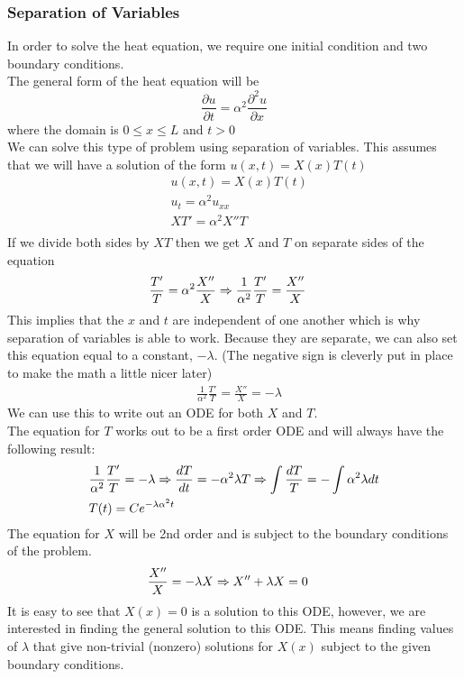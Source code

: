 \documentclass[11pt, fleqn]{article}
\begin{document}
\subsubsection{Separation of Variables}
In order to solve the heat equation, we require one initial condition and two boundary conditions.\\
The general form of the heat equation will be
$$\frac{\partial u}{\partial t}=\alpha^2\frac{\partial^2u}{\partial x}$$
where the domain is $0\leq x\leq L$ and $t>0$\\
We can solve this type of problem using separation of variables. This assumes that we will have a solution of the form $u(x,t)=X(x)T(t)$
\begin{align*}
    &u(x,t)=X(x)T(t)\\
    &u_t=\alpha^2 u_{xx}\\
    &XT'=\alpha^2X''T\\
\end{align*}
If we divide both sides by $XT$ then we get $X$ and $T$ on separate sides of the equation
\begin{align*}
    &\frac{T'}{T}=\alpha^2\frac{X''}{X}\Rightarrow \frac{1}{\alpha^2}\frac{T'}{T}=\frac{X''}{X}
\end{align*}
This implies that the $x$ and $t$ are independent of one another which is why separation of variables is able to work. Because they are separate, we can also set this equation equal to a constant, $-\lambda$. (The negative sign is cleverly put in place to make the math a little nicer later)
\begin{align*}
    &\frac{1}{\alpha^2}\frac{T'}{T}=\frac{X''}{X}=-\lambda
\end{align*}
We can use this to write out an ODE for both $X$ and $T$.\\
The equation for $T$ works out to be a first order ODE and will always have the following result:
\begin{align*}
    &\frac{1}{\alpha^2}\frac{T'}{T}=-\lambda\Rightarrow \frac{dT}{dt}=-\alpha^2\lambda T\Rightarrow \int \frac{dT}{T}=-\int\alpha^2\lambda dt\\
    &T(t)=Ce^{-\lambda\alpha^2t}
\end{align*}
The equation for $X$ will be 2nd order and is subject to the boundary conditions of the problem.
\begin{align*}
    &\frac{X''}{X}=-\lambda X\Rightarrow X''+\lambda X=0
\end{align*}
It is easy to see that $X(x)=0$ is a solution to this ODE, however, we are interested in finding the general solution to this ODE. This means finding values of $\lambda$ that give non-trivial (nonzero) solutions for $X(x)$ subject to the given boundary conditions.\\
\end{document}
